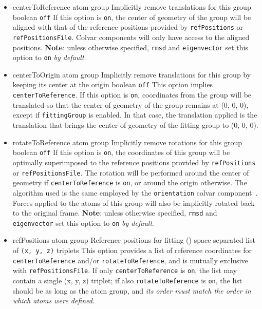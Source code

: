 \begin{itemize}

\item %
  \keydef
    {centerToReference}{%
    atom group}{%
    Implicitly remove translations for this group}{%
    boolean}{%
    \texttt{off}}{%
    If this option is \texttt{on}, the center of geometry of the group will be aligned with that of the reference positions provided by  \texttt{refPositions} or \texttt{refPositionsFile}.
    Colvar components will only have access to the aligned positions.
\textbf{Note}: unless otherwise specified, \texttt{rmsd} and \texttt{eigenvector} set this option to \texttt{on} \emph{by default}.
}

\item %
  \keydef
    {centerToOrigin}{%
    atom group}{%
    Implicitly remove translations for this group by keeping its center at the origin}{%
    boolean}{%
    \texttt{off}}{%
    This option implies \texttt{centerToReference}.
    If this option is \texttt{on}, coordinates from the group will be translated so that the center of geometry of the group remains at (0, 0, 0), except if 
    \texttt{fittingGroup} is enabled.
    In that case, the translation applied is the translation that brings the center of geometry of the fitting group to (0, 0, 0).
}

\item %
  \keydef
    {rotateToReference}{%
    atom group}{%
    Implicitly remove rotations for this group}{%
    boolean}{%
    \texttt{off}}{%
    If this option is \texttt{on}, the coordinates of this group will be optimally superimposed to the reference positions provided by  \texttt{refPositions} or \texttt{refPositionsFile}.
    The rotation will be performed around the center of geometry if \texttt{centerToReference} is \texttt{on}, or around the origin otherwise.
    The algorithm used is the same employed by the \texttt{orientation} colvar component~\cite{Coutsias2004}.
    Forces applied to the atoms of this group will also be implicitly rotated back to the original frame.
    \textbf{Note}: unless otherwise specified, \texttt{rmsd} and \texttt{eigenvector} set this option to \texttt{on} \emph{by default}.
}

\item %
  \key%
    {refPositions}{%
    atom group}{%
    Reference positions for fitting (\lengthunit)}{%
    space-separated list of \texttt{(x, y, z)} triplets}{%
    \label{key:colvars:atom_group:refPositions}
    This option provides a list of reference coordinates for \texttt{centerToReference} and/or \texttt{rotateToReference}, and is mutually exclusive with \texttt{refPositionsFile}.
    If only \texttt{centerToReference} is \texttt{on}, the list may contain a single (x, y, z) triplet; if also \texttt{rotateToReference} is \texttt{on}, the list should be as long as the atom group, and \emph{its order must match the order in which atoms were defined}.
}


\end{itemize}
